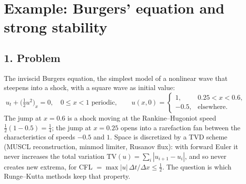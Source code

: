 \documentclass[11pt,a4paper]{article}
\begin{document}
\section*{Example: Burgers' equation and strong stability}

\subsection*{1. Problem}
The inviscid Burgers equation, the simplest model of a nonlinear wave that
steepens into a shock, with a square wave as initial value:
\begin{equation*}
  u_t + \bigl(\tfrac12 u^2\bigr)_x = 0, \quad 0 \le x < 1 \text{ periodic}, \qquad
  u(x, 0) = \begin{cases} 1, & 0.25 < x < 0.6,\\ -0.5, & \text{elsewhere.}\end{cases}
\end{equation*}
The jump at $x = 0.6$ is a shock moving at the Rankine--Hugoniot speed
$\tfrac12(1 - 0.5) = \tfrac14$; the jump at $x = 0.25$ opens into a
rarefaction fan between the characteristics of speeds $-0.5$ and $1$. Space
is discretized by a TVD scheme (MUSCL reconstruction, minmod limiter, Rusanov
flux): with forward Euler it never increases the total variation
$\mathrm{TV}(u) = \sum_i |u_{i+1} - u_i|$, and so never creates new extrema,
for CFL $= \max|u|\,\Delta t/\Delta x \le \tfrac12$. The question is which
Runge--Kutta methods keep that property.
\begin{center}
\small

\end{center}

\newpage
\end{document}
